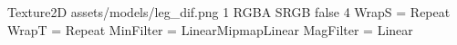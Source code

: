 Texture2D
assets/models/leg_dif.png
1
RGBA
SRGB
false
4
WrapS = Repeat
WrapT = Repeat
MinFilter = LinearMipmapLinear
MagFilter = Linear
